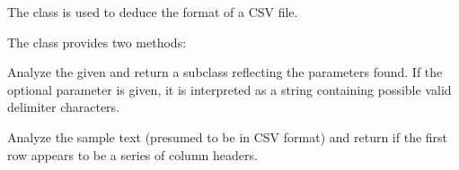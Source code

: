\documentclass[letterpaper,10pt,english]{sphinxmanual}
\begin{document}
\begin{fulllineitems}
\label{\detokenize{csv:csv.Sniffer}}
The {\hyperref[\detokenize{csv:csv.Sniffer}]{}} class is used to deduce the format of a CSV file.

The {\hyperref[\detokenize{csv:csv.Sniffer}]{}} class provides two methods:

\vspace{5px}

\begin{fulllineitems}
\label{\detokenize{csv:csv.Sniffer.sniff}}
Analyze the given  and return a {\hyperref[\detokenize{csv:csv.Dialect}]{}} subclass
reflecting the parameters found.  If the optional  parameter
is given, it is interpreted as a string containing possible valid
delimiter characters.

\end{fulllineitems}


\vspace{5px}

\begin{fulllineitems}
\label{\detokenize{csv:csv.Sniffer.has_header}}
Analyze the sample text (presumed to be in CSV format) and return
 if the first row appears to be a series of column headers.

\end{fulllineitems}


\end{fulllineitems}
\end{document}
